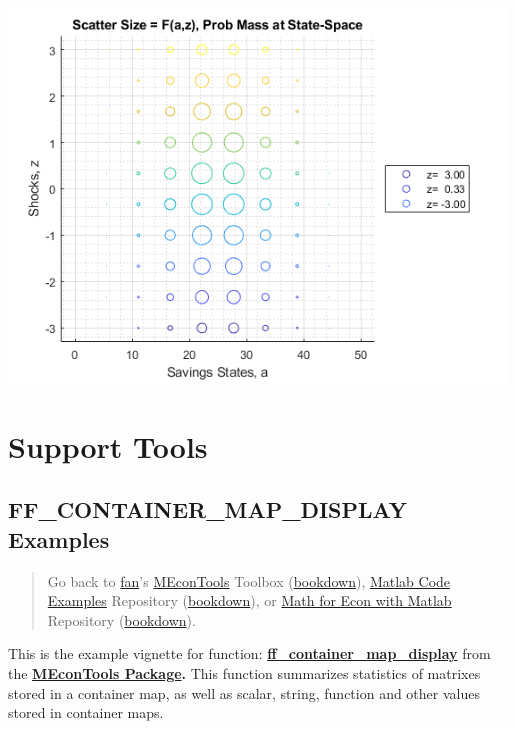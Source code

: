 \documentclass[
]{book}
\begin{document}
\includegraphics[width=5.20833in,height=\textheight]{img/fx_graph_grid_images/figure_8.png}

\hypertarget{support-tools}{%
\chapter{Support Tools}\label{support-tools}}

\hypertarget{ff_container_map_display-examples}{%
\section{FF\_CONTAINER\_MAP\_DISPLAY Examples}\label{ff_container_map_display-examples}}

\begin{quote}
Go back to \href{http://fanwangecon.github.io/}{fan}'s \href{https://fanwangecon.github.io/MEconTools/}{MEconTools} Toolbox (\href{https://fanwangecon.github.io/MEconTools/bookdown}{bookdown}), \href{https://fanwangecon.github.io/M4Econ/}{Matlab Code Examples} Repository (\href{https://fanwangecon.github.io/M4Econ/bookdown}{bookdown}), or \href{https://fanwangecon.github.io/Math4Econ/}{Math for Econ with Matlab} Repository (\href{https://fanwangecon.github.io/Math4Econ/bookdown}{bookdown}).
\end{quote}

This is the example vignette for function:
\href{https://github.com/FanWangEcon/MEconTools/blob/master/MEconTools/tools/ff_container_map_display.m}{\textbf{ff\_container\_map\_display}}
from the \href{https://fanwangecon.github.io/MEconTools/}{\textbf{MEconTools
Package}}\textbf{.} This function
summarizes statistics of matrixes stored in a container map, as well as
scalar, string, function and other values stored in container maps.
\end{document}
